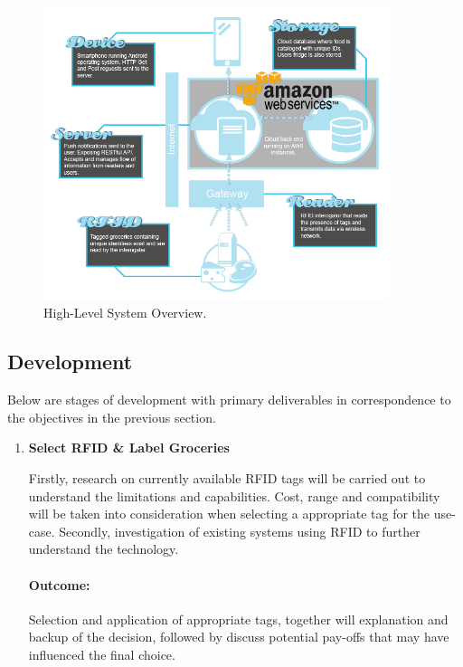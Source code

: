 \documentclass[a4paper, 11pt]{article}
\begin{document}
{  \vspace{\baselineskip}
\begin{figure}[h!]
  \centering
    \includegraphics[width=0.9\textwidth]{system6.png}
      \caption{High-Level System Overview.}
\end{figure}

\subsection{Development}
Below are stages of development with primary deliverables in correspondence to the objectives in the previous section.

\begin{enumerate}

   \item \textbf{Select RFID \& Label Groceries}
   	\begin{flushleft}Firstly, research on currently available RFID tags will be carried out to understand the limitations and capabilities. Cost, range and compatibility will be taken into consideration when selecting a appropriate tag for the use-case. Secondly, investigation of existing systems using RFID to further understand the technology. 
	\paragraph{Outcome:} Selection and application of appropriate tags, together will explanation and backup of the decision, followed by discuss potential pay-offs that may have influenced the final choice.
	  	\end{flushleft}
	  \vspace{\baselineskip}


\end{enumerate}}
\end{document}
